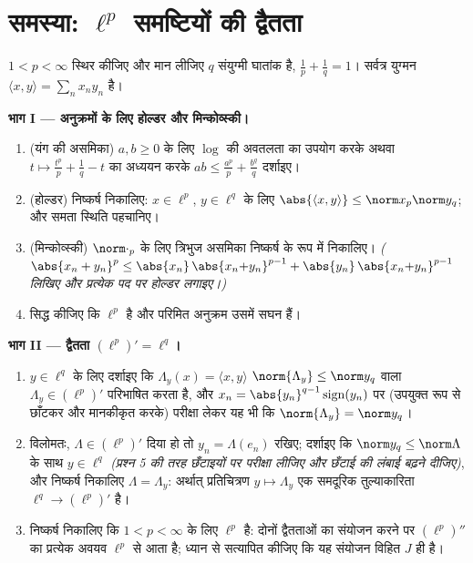 \section{समस्या: \texorpdfstring{$\ell^p$}%
{lp} समष्टियों की द्वैतता}

\begin{problem}[{सप्ताहांत समस्या --- $(\ell^p)' = \ell^q$, स्वद्वैतिता, और
$\ell^\infty$ की विचित्रता}]
\label{pb:b3:banach:1}
$1 < p < \infty$ स्थिर कीजिए और मान लीजिए $q$ संयुग्मी घातांक है, $\frac1p + \frac1q = 1$।
सर्वत्र युग्मन $\langle x,
y\rangle = \sum_n x_ny_n$ है।

\medskip
\noindent\textbf{भाग I --- अनुक्रमों के लिए होल्डर और
मिन्कोव्स्की।}
\begin{enumerate}
  \item (यंग की असमिका) $a, b \geq 0$ के लिए $\log$ की अवतलता का उपयोग
        करके अथवा $t \mapsto \frac{t^p}p + \frac1q - t$ का अध्ययन करके $ab \leq
        \frac{a^p}p + \frac{b^q}q$ दर्शाइए।
  \item (होल्डर) निष्कर्ष निकालिए: $x \in \ell^p$, $y \in \ell^q$ के लिए $\abs{\langle x, y\rangle} \leq
        \norm x_p\norm y_q$;
        और समता स्थिति पहचानिए।
  \item (मिन्कोव्स्की) $\norm\cdot_p$ के लिए त्रिभुज असमिका निष्कर्ष के
        रूप में निकालिए। \emph{($\abs{x_n + y_n}^p \leq
        \abs{x_n}\,\abs{x_n{+}y_n}^{p-1} +
        \abs{y_n}\,\abs{x_n{+}y_n}^{p-1}$ लिखिए और प्रत्येक पद पर
        होल्डर लगाइए।)}
  \item सिद्ध कीजिए कि $\ell^p$  है और परिमित अनुक्रम उसमें
        सघन हैं।
\end{enumerate}

\medskip
\noindent\textbf{भाग II --- द्वैतता $(\ell^p)' =
\ell^q$।}
\begin{enumerate}[resume]
  \item $y \in \ell^q$ के लिए दर्शाइए कि $\Lambda_y(x) = \langle
        x, y\rangle$ $\norm{\Lambda_y} \leq \norm y_q$ वाला $\Lambda_y \in (\ell^p)'$ परिभाषित
        करता है, और
        $x_n = \abs{y_n}^{q-1}\operatorname{sign}(y_n)$
        पर (उपयुक्त रूप से छाँटकर और मानकीकृत करके) परीक्षा लेकर
        यह भी कि $\norm{\Lambda_y} = \norm y_q$।
  \item विलोमतः, $\Lambda \in (\ell^p)'$ दिया हो तो $y_n =
        \Lambda(e_n)$ रखिए; दर्शाइए कि $\norm y_q \leq
        \norm\Lambda$
        के साथ $y \in \ell^q$ \emph{(प्रश्न 5 की तरह छँटाइयों पर परीक्षा
        लीजिए और छँटाई की लंबाई बढ़ने दीजिए)}, और निष्कर्ष
        निकालिए $\Lambda = \Lambda_y$: अर्थात् प्रतिचित्रण $y \mapsto \Lambda_y$ एक समदूरिक
        तुल्याकारिता $\ell^q \to (\ell^p)'$ है।
  \item निष्कर्ष निकालिए कि $1 < p <
        \infty$ के लिए $\ell^p$
        \emph{} है: दोनों द्वैतताओं का संयोजन करने पर
        $(\ell^p)''$ का प्रत्येक अवयव $\ell^p$ से आता है; ध्यान से
        सत्यापित कीजिए कि यह संयोजन विहित $J$ ही है।
\end{enumerate}


\end{problem}

